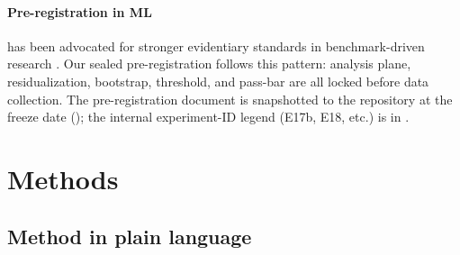 \documentclass[10pt, letterpaper]{article}
\begin{document}
\paragraph{Pre-registration in ML} has been advocated for stronger
evidentiary standards in benchmark-driven research
\citep{nosek2018preregistration, pineau2021reproducibility}. Our
sealed pre-registration follows this pattern: analysis plane,
residualization, bootstrap, threshold, and pass-bar are all locked
before data collection. The pre-registration document is snapshotted
to the repository at the freeze date (); the internal
experiment-ID legend (E17b, E18, etc.) is in
.

\section{Methods}
\label{sec:methods}

\subsection*{Method in plain language}
\end{document}
